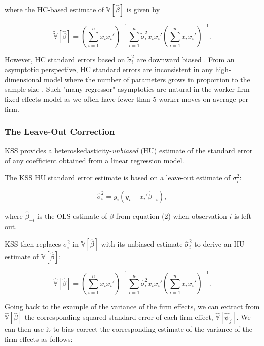 \documentclass[11pt]{article}
\begin{document}
where the HC-based estimate of \(\mathbb{V}[\hat{\beta}]\) is given by

\begin{equation}
\tilde{\mathbb{{V}}}[\hat{\beta}]=\left(\sum_{i=1}^{n}x_{i}x_{i}'\right)^{-1}\sum_{i=1}^{n}\tilde{{\sigma}}^{2}_{i}x_{i}x_{i}'\left(\sum_{i=1}^{n}x_{i}x_{i}'\right)^{-1}.
\end{equation}

However, HC standard errors based on \(\tilde{\sigma}^{2}_{i}\) are downward biased \citep{mackinnon1985some}. From an asymptotic perspective, HC standard errors are
inconsistent in any high-dimensional model where the number of
parameters grows in proportion to the sample size \citep{cattaneo2017inference}. Such "many regressor" asymptotics are natural in the worker-firm fixed effects model  as we often have fewer than 5 worker moves on average per firm.

\hypertarget{the-leave-out-correction}{%
\subsubsection{The Leave-Out
Correction}\label{the-leave-out-correction}}

KSS provides a heteroskedasticity-\emph{unbiased} (HU) estimate of the
standard error of any coefficient obtained from a
linear regression model.

The KSS HU standard error estimate is based on a leave-out estimate of
\(\sigma^{2}_{i}\):

\begin{equation}
\hat{\sigma}^{2}_{i}=y_{i}(y_{i}-x_{i}'\hat{\beta}_{-i}),
\end{equation}

where \(\hat{\beta}_{-i}\) is the OLS estimate of \(\beta\) from
equation (2) when observation \(i\) is left out.

KSS then replaces \(\sigma^{2}_{i}\) in \(\mathbb{V}[\hat{\beta}]\) with
its unbiased estimate \(\hat{\sigma}^{2}_{i}\) to derive an HU estimate
of \(\mathbb{V}[\hat{\beta}]:\)

\begin{equation}
\hat{\mathbb{{V}}}[\hat{\beta}]=\left(\sum_{i=1}^{n}x_{i}x_{i}'\right)^{-1}\sum_{i=1}^{n}\hat{{\sigma}}^{2}_{i}x_{i}x_{i}'\left(\sum_{i=1}^{n}x_{i}x_{i}'\right)^{-1}.
\end{equation}

Going back to the example of the variance of the firm effects, we can
extract from \(\hat{\mathbb{V}}[\hat{\beta}]\) the corresponding squared
standard error of each firm effect, \(\hat{\mathbb{V}}[\hat{\psi}_{j}]\).
We can then use it to bias-correct the corresponding estimate of
the variance of the firm effects as follows:
\end{document}
